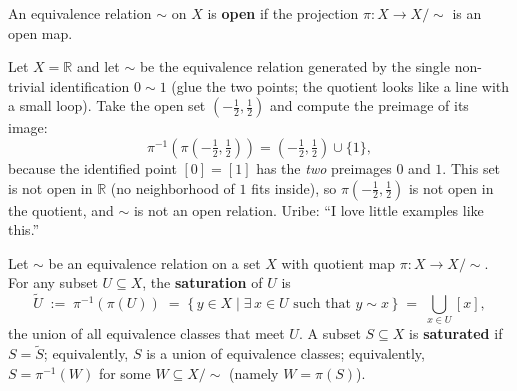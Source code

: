 \documentclass[11pt]{report}
\makeatletter
\newcounter{defcounter}[section]
\newcounter{excounter}[section]
\newcommand{\deflabel}[1]{\edef\@currentlabel{\arabic{section}.\arabic{defcounter}}\label{#1}}
\newcommand{\exlabel}[1]{\edef\@currentlabel{\arabic{section}.\arabic{excounter}}\label{#1}}
\makeatother
\begin{document}
\begin{defbox}\deflabel{def:open-equivalence-relation}
An equivalence relation $\sim$ on $X$ is \textbf{open} if the projection $\pi : X \to X/{\sim}$ is an open map.
\end{defbox}

\begin{exbox}\exlabel{ex:nonopen-relation}
Let $X = \mathbb{R}$ and let $\sim$ be the equivalence relation generated by the single non-trivial identification $0 \sim 1$ (glue the two points; the quotient looks like a line with a small loop). Take the open set $\left(-\tfrac12, \tfrac12\right)$ and compute the preimage of its image:
\[
\pi^{-1}\!\left(\pi\!\left(-\tfrac12, \tfrac12\right)\right) = \left(-\tfrac12, \tfrac12\right) \cup \{1\},
\]
because the identified point $[0] = [1]$ has the \emph{two} preimages $0$ and $1$. This set is not open in $\mathbb{R}$ (no neighborhood of $1$ fits inside), so $\pi\left(-\tfrac12,\tfrac12\right)$ is not open in the quotient, and $\sim$ is not an open relation. Uribe: ``I love little examples like this.''
\end{exbox}

\begin{defbox}\deflabel{def:saturation}
Let $\sim$ be an equivalence relation on a set $X$ with quotient map $\pi : X \to X/{\sim}$. For any subset $U \subseteq X$, the \textbf{saturation} of $U$ is
\[
\tilde U \;:=\; \pi^{-1}(\pi(U)) \;=\; \{\, y \in X \mid \exists\, x \in U \text{ such that } y \sim x \,\} \;=\; \bigcup_{x \in U} [x],
\]
the union of all equivalence classes that meet $U$. A subset $S \subseteq X$ is \textbf{saturated} if $S = \tilde S$; equivalently, $S$ is a union of equivalence classes; equivalently, $S = \pi^{-1}(W)$ for some $W \subseteq X/{\sim}$ (namely $W = \pi(S)$).
\end{defbox}
\end{document}
